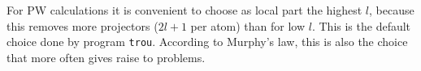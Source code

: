 For PW calculations it is convenient to choose as local part the
highest $l$, because this removes more projectors ($2l+1$ per atom)
than for low $l$. This is the default choice done by program {\tt trou}.
According to Murphy's law, this is also the choice that
more often gives raise to problems.


\appendix

